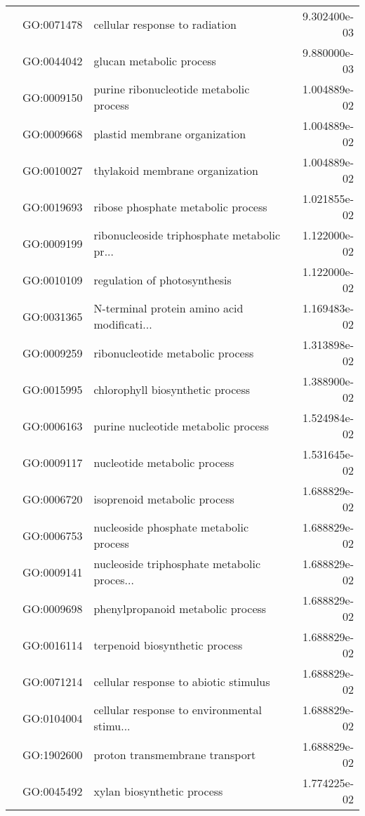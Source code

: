\begin{longtable}{lllr}
   & GO:0071478 &               cellular response to radiation &  9.302400e-03 \\
   & GO:0044042 &                     glucan metabolic process &  9.880000e-03 \\
   & GO:0009150 &      purine ribonucleotide metabolic process &  1.004889e-02 \\
   & GO:0009668 &                plastid membrane organization &  1.004889e-02 \\
   & GO:0010027 &              thylakoid membrane organization &  1.004889e-02 \\
   & GO:0019693 &           ribose phosphate metabolic process &  1.021855e-02 \\
   & GO:0009199 &  ribonucleoside triphosphate metabolic pr... &  1.122000e-02 \\
   & GO:0010109 &                 regulation of photosynthesis &  1.122000e-02 \\
   & GO:0031365 &  N-terminal protein amino acid modificati... &  1.169483e-02 \\
   & GO:0009259 &             ribonucleotide metabolic process &  1.313898e-02 \\
   & GO:0015995 &             chlorophyll biosynthetic process &  1.388900e-02 \\
   & GO:0006163 &          purine nucleotide metabolic process &  1.524984e-02 \\
   & GO:0009117 &                 nucleotide metabolic process &  1.531645e-02 \\
   & GO:0006720 &                 isoprenoid metabolic process &  1.688829e-02 \\
   & GO:0006753 &       nucleoside phosphate metabolic process &  1.688829e-02 \\
   & GO:0009141 &  nucleoside triphosphate metabolic proces... &  1.688829e-02 \\
   & GO:0009698 &            phenylpropanoid metabolic process &  1.688829e-02 \\
   & GO:0016114 &               terpenoid biosynthetic process &  1.688829e-02 \\
   & GO:0071214 &        cellular response to abiotic stimulus &  1.688829e-02 \\
   & GO:0104004 &  cellular response to environmental stimu... &  1.688829e-02 \\
   & GO:1902600 &               proton transmembrane transport &  1.688829e-02 \\
   & GO:0045492 &                   xylan biosynthetic process &  1.774225e-02 \\

\end{longtable}
